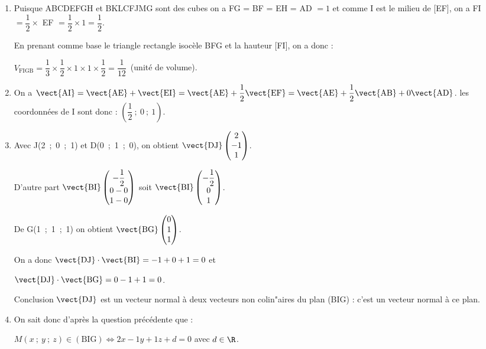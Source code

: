 \begin{enumerate}
\item 




Puisque ABCDEFGH et BKLCFJMG sont des cubes on a FG = BF = EH = AD $ = 1$ et comme I est le milieu de [EF], on a FI $= \dfrac12 \times $ EF $ = \dfrac12 \times 1 = \dfrac12$.

En prenant comme base le triangle rectangle isocèle BFG et la hauteur [FI], on a donc :

$V_{\text{FIGB}} = \dfrac13 \times \dfrac12 \times 1 \times 1 \times \dfrac12 = \dfrac{1}{12}$~(unité de volume).
\item 
On a $\vect{\text{AI}} = \vect{\text{AE}} + \vect{\text{EI}} = \vect{\text{AE}} + \dfrac12\vect{\text{EF}} = \vect{\text{AE}} + \dfrac12\vect{\text{AB}} + 0\vect{\text{AD}}$. les coordonnées de I sont donc : $\left(\dfrac12~;~0~;~1\right)$.
\item 
Avec J(2~;~0~;~1) et D(0~;~1~;~0), on obtient $\vect{\text{DJ}}\begin{pmatrix}2\\-1\\1\end{pmatrix}$.

D'autre part $\vect{\text{BI}}\begin{pmatrix}- \dfrac12\\0 - 0\\1 - 0 \end{pmatrix}$ soit $\vect{\text{BI}}\begin{pmatrix}- \dfrac12\\0 \\1\end{pmatrix}$.

De G(1~;~1~;~1) on obtient $\vect{\text{BG}}\begin{pmatrix}0\\1\\1\end{pmatrix}$.

On a donc $\vect{\text{DJ}}\cdot \vect{\text{BI}} = -1 + 0 + 1 = 0$ et 

$\vect{\text{DJ}}\cdot \vect{\text{BG}} = 0 - 1 + 1 = 0$.

Conclusion $\vect{\text{DJ}}$ est un vecteur normal à deux vecteurs non colin"aires du plan (BIG) : c'est un vecteur normal à ce plan.
\item 
On sait donc d'après la question précédente que :

$M(x~;~y~;~z) \in (\text{BIG}) \iff 2x - 1y + 1z + d = 0$ avec $d \in \R$.


\end{enumerate}
